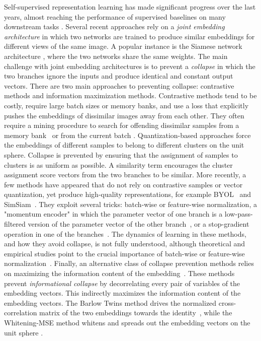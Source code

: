 \documentclass{article} %
\begin{document}
Self-supervised representation learning has made significant progress over the last years, almost reaching the performance of supervised baselines on many downstream tasks \cite{bachman2019mutual, misra2020pirl, he2020moco, tian2020makes, caron2020swav, grill2020byol, chen2020simsiam, gidaris2021obow, zbontar2021barlow}. Several recent approaches rely on a {\em joint embedding architecture} in which two networks are trained to produce similar embeddings for different views of the same image. A popular instance is the Siamese network architecture \cite{bromley1994siamese}, where the two networks share the same weights. The main challenge with joint embedding architectures is to prevent a {\em collapse} in which the two branches ignore the inputs and produce identical and constant output vectors. There are two main approaches to preventing collapse: contrastive methods and information maximization methods. Contrastive \cite{bromley1994siamese, chopra2005,he2020moco, hjelm2019mutual, chen2020simclr} methods tend to be costly, require large batch sizes or memory banks, and use a loss that explicitly pushes the embeddings of dissimilar images away from each other. They often require a mining procedure to search for offending dissimilar samples from a memory bank~\cite{he2020moco} or from the current batch \cite{chen2020simclr}. Quantization-based approaches \cite{caron2020swav, caron2018clustering} force the embeddings of different samples to belong to different clusters on the unit sphere. Collapse is prevented by ensuring that the assignment of samples to clusters is as uniform as possible. A similarity term encourages the cluster assignment score vectors from the two branches to be similar. More recently, a few methods have appeared that do not rely on contrastive samples or vector quantization, yet produce high-quality representations, for example BYOL~\cite{grill2020byol} and SimSiam~\cite{chen2020simsiam}. They exploit several tricks: batch-wise or feature-wise normalization, a "momentum encoder" in which the parameter vector of one branch is a low-pass-filtered version of the parameter vector of the other branch~\cite{grill2020byol, richemond2020byolworks}, or a stop-gradient operation in one of the branches~\cite{chen2020simsiam}. The dynamics of learning in these methods, and how they avoid collapse, is not fully understood, although theoretical and empirical studies point to the crucial importance of batch-wise or feature-wise normalization~\cite{richemond2020byolworks,tian2021understanding}. Finally, an alternative class of collapse prevention methods relies on maximizing the information content of the embedding~\cite{zbontar2021barlow, ermolov2021whitening}. These methods prevent {\em informational collapse} by decorrelating every pair of variables of the embedding vectors. This indirectly maximizes the information content of the embedding vectors. The Barlow Twins method drives the normalized cross-correlation matrix of the two embeddings towards the identity~\cite{zbontar2021barlow}, while the Whitening-MSE method whitens and spreads out the embedding vectors on the unit sphere \cite{ermolov2021whitening}.
\end{document}
